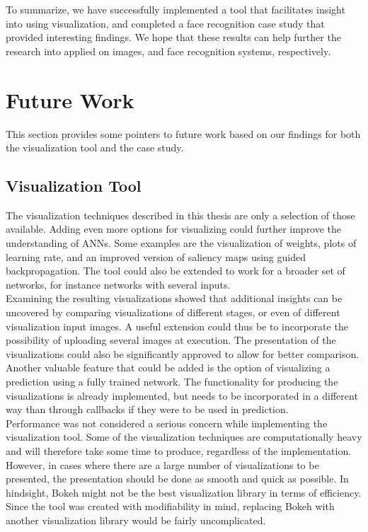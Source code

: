 \noindent To summarize, we have successfully implemented a tool that facilitates insight into  using visualization, and completed a face recognition case study that provided interesting findings. We hope that these results can help further the research into  applied on images, and face recognition systems, respectively.

\section{Future Work}

This section provides some pointers to future work based on our findings for both the visualization tool and the case study.

\subsection{Visualization Tool}

The visualization techniques described in this thesis are only a selection of those available. Adding even more options for visualizing could further improve the understanding of ANNs. Some examples are the visualization of weights, plots of learning rate, and an improved version of saliency maps using guided backpropagation. The tool could also be extended to work for a broader set of networks, for instance networks with several inputs. \\

\noindent Examining the resulting visualizations showed that additional insights can be uncovered by comparing visualizations of different stages, or even of different visualization input images. A useful extension could thus be to incorporate the possibility of uploading several images at execution. The presentation of the visualizations could also be significantly approved to allow for better comparison. Another valuable feature that could be added is the option of visualizing a prediction using a fully trained network. The functionality for producing the visualizations is already implemented, but needs to be incorporated in a different way than through callbacks if they were to be used in prediction.\\

\noindent Performance was not considered a serious concern while implementing the visualization tool. Some of the visualization techniques are computationally heavy and will therefore take some time to produce, regardless of the implementation. However, in cases where there are a large number of visualizations to be presented, the presentation should be done as smooth and quick as possible. In hindsight, Bokeh might not be the best visualization library in terms of efficiency. Since the tool was created with modifiability in mind, replacing Bokeh with another visualization library would be fairly uncomplicated. 

